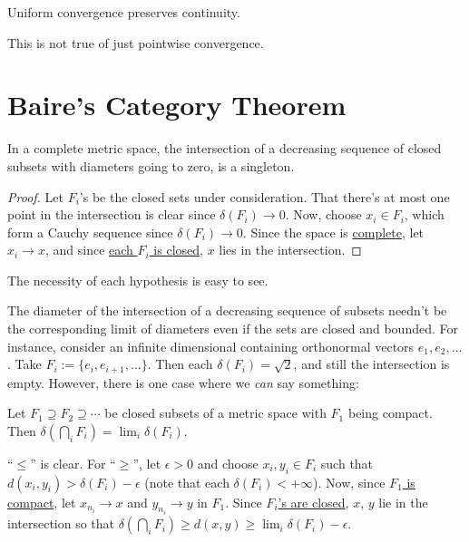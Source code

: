 	\begin{cor}
		Uniform convergence preserves continuity.
	\end{cor}
	
	This is \ofc not true of just pointwise convergence.
	
	
	
	
	


\section{Baire's Category Theorem}

	\begin{prp}
		In a complete metric space, the intersection of a decreasing sequence of closed subsets with diameters going to zero, is a singleton.
	\end{prp}
	
	\begin{proof}
		Let $F_i$'s be the closed sets under consideration. That there's at most one point in the intersection is clear since \uline{$\delta(F_i)\to 0$}. Now, choose
		$x_i\in F_i$, which form a Cauchy sequence since \uline{$\delta(F_i)\to 0$}. Since the space is \uline{complete}, let $x_i\to x$, and since \uline{each $F_i$ is closed}, $x$ lies in the intersection.
	\end{proof}
	
	\begin{rmk}
		The necessity of each hypothesis is easy to see.
	\end{rmk}
	
	\begin{dgrs}
		The diameter of the intersection of a decreasing sequence of subsets needn't be the corresponding limit of diameters even if the sets are closed and bounded. For instance, consider an infinite dimensional \NLS containing orthonormal vectors $e_1, e_2, \ldots$. Take $F_i := \{e_i, e_{i + 1}, \ldots\}$. Then each $\delta(F_i) = \sqrt 2$, and still the intersection is empty. However, there is one case where we \emph{can} say something:
		
		\begin{prp}
			Let $F_1\supseteq F_2\supseteq\cdots$ be closed subsets of a metric space with $F_1$ being compact. Then $\delta(\bigcap_i F_i) = \lim_i\delta(F_i)$.
		\end{prp}
		
		\begin{dgrsProof}
			``$\le$'' is clear. For ``$\ge$'', let $\epsilon> 0$ and choose $x_i, y_i\in F_i$ such that $d(x_i, y_i) > \delta(F_i) - \epsilon$ (note that each $\delta(F_i) < +\infty$). Now, since \uline{$F_1$ is compact}, let $x_{n_i}\to x$ and $y_{n_i}\to y$ in $F_1$. Since \uline{$F_i$'s are closed}, $x$, $y$ lie in the intersection so that $\delta(\bigcap_i F_i)\ge d(x, y)\ge \lim_i\delta(F_i) - \epsilon$.
		\end{dgrsProof}
	\end{dgrs}
	
